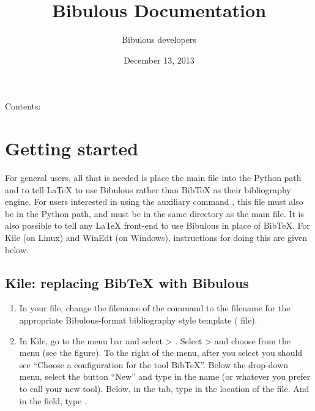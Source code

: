\documentclass[letterpaper,10pt,english]{sphinxmanual}
\title{Bibulous Documentation}
\date{December 13, 2013}
\author{Bibulous developers}
\begin{document}
\maketitle
\tableofcontents
{}\label{index::doc}


Contents:


\chapter{Getting started}
\label{getting_started:bibulous-documentation}\label{getting_started:getting-started}\label{getting_started::doc}
For general users, all that is needed is place the main  file into the Python path and to tell LaTeX to use Bibulous rather than BibTeX as their bibliography engine. For users interested in using the auxiliary command , this file must also be in the Python path, and must be in the same directory as the main file. It is also possible to tell any LaTeX front-end to use Bibulous in place of BibTeX. For Kile (on Linux) and WinEdt (on Windows), instructions for doing this are given below.


\section{Kile: replacing BibTeX with Bibulous}
\label{getting_started:kile-replacing-bibtex-with-bibulous}\begin{enumerate}
\item {} 
In your  file, change the filename of the  command to the filename for the appropriate Bibulous-format bibliography style template ( file).

\item {} 
In Kile, go to the menu bar and select  \textgreater{} . Select  \textgreater{}  and choose  from the  menu (see the figure). To the right of the menu, after you select  you should see ``Choose a configuration for the tool BibTeX''. Below the drop-down menu, select the button ``New'' and type in the name  (or whatever you prefer to call your new tool). Below, in the  tab, type in the location of the  file. And in the  field, type .

\end{enumerate}
\end{document}
